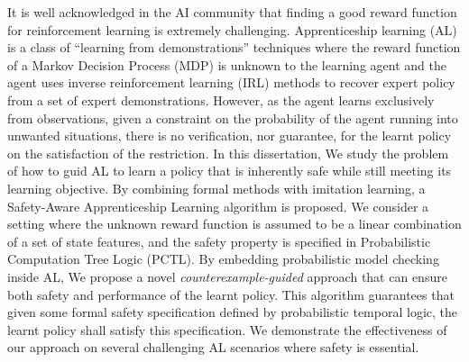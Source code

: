 It is well acknowledged in the AI community that finding a good reward function for reinforcement learning is extremely challenging. Apprenticeship learning (AL) is a class of ``learning from demonstrations'' techniques where the reward function of a Markov Decision Process (MDP) is unknown to the learning agent and the agent uses inverse reinforcement learning (IRL) methods to recover expert policy from a set of expert demonstrations. However, as the agent learns exclusively from observations, given a constraint on the probability of the agent running into unwanted situations, there is no verification, nor guarantee, for the learnt policy on the satisfaction of the restriction. In this dissertation, We study the problem of how to guid AL to learn a policy that is inherently safe while still meeting its learning objective. By combining formal methods with imitation learning, a Safety-Aware Apprenticeship Learning algorithm is proposed. We consider a setting where the unknown reward function is assumed to be a linear combination of a set of state features, and the safety property is specified in Probabilistic Computation Tree Logic (PCTL). By embedding probabilistic model checking inside AL, We propose a novel {\it counterexample-guided} approach that can ensure both safety and performance of the learnt policy. This algorithm guarantees that given some formal safety specification defined by probabilistic temporal logic, the learnt policy shall satisfy this specification. We demonstrate the effectiveness of our approach on several challenging AL scenarios where safety is essential.